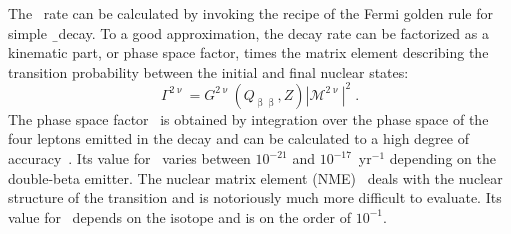 The \nnbb\ rate can be calculated by invoking the recipe of the Fermi golden rule for
simple \b\ decay. To a good approximation, the decay rate can be factorized as a kinematic
part, or phase space factor, times the matrix element describing the transition
probability between the initial and final nuclear states:
\[
  \Gamma^{2\upnu} = G^{2\upnu}(Q_{\upbeta\upbeta},Z) |\mathcal{M}^{2\upnu}|^2 \;.
\]
The phase space factor \psft\ is obtained by integration over the phase space of the four
leptons emitted in the decay and can be calculated to a high degree of
accuracy~\cite{Kotila2012, Stoica2013}. Its value for \nnbb\ varies between $10^{-21}$ and
$10^{-17}$~yr$^{-1}$ depending on the double-beta emitter.  The nuclear matrix element
(NME) \nmet\ deals with the nuclear structure of the transition and is notoriously much
more difficult to evaluate. Its value for \nnbb\ depends on the isotope and is on the
order of $10^{-1}$.

